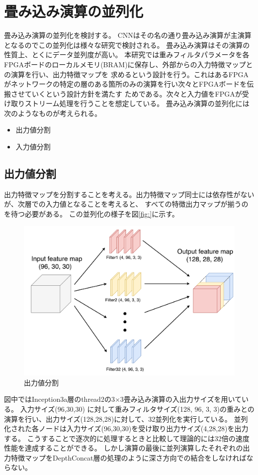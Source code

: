 {\section{畳み込み演算の並列化}
\label{sec:conv_para}
畳み込み演算の並列化を検討する。
CNNはその名の通り畳み込み演算が主演算となるのでこの並列化は様々な研究で検討される。
畳み込み演算はその演算の性質上、とくにデータ並列度が高い。
本研究では重みフィルタパラメータを各FPGAボードのローカルメモリ(BRAM)に保存し、外部からの入力特徴マップとの演算を行い、出力特徴マップを
求めるという設計を行う。これはあるFPGAがネットワークの特定の層のある箇所のみの演算を行い次々とFPGAボードを伝搬させていくという設計方針を満たす
ためである。次々と入力値をFPGAが受け取りストリーム処理を行うことを想定している。
畳み込み演算の並列化には次のようなものが考えられる。
\begin{itemize}
    \item 出力値分割
    \item 入力値分割
\end{itemize}
\subsection{出力値分割}
\label{subsec:para_output}
出力特徴マップを分割することを考える。出力特徴マップ同士には依存性がないが、次層での入力値となることを考えると、
すべての特徴出力マップが揃うのを待つ必要がある。
この並列化の様子を図\ref{fig:}に示す。
\begin{figure}[h]
    \centering
    \includegraphics[width=12cm]{./chap5/fig/conv_para_output.pdf}
    \caption{出力値分割}
    \label{fig:conv_para_output}
\end{figure}
図中ではInception3a層のthread2の3$\times$3畳み込み演算の入出力サイズを用いている。
入力サイズ(96,30,30) に対して重みフィルタサイズ(128, 96, 3, 3)の重みとの演算を行い、出力サイズ(128,28,28)に対して、32並列化を実行している。
並列化された各ノードは入力サイズ(96,30,30)を受け取り出力サイズ(4,28,28)を出力する。
こうすることで逐次的に処理するときと比較して理論的には32倍の速度性能を達成することができる。
しかし演算の最後に並列演算したそれぞれの出力特徴マップをDepthConcat層の処理のように深さ方向での結合をしなければならない。
}
